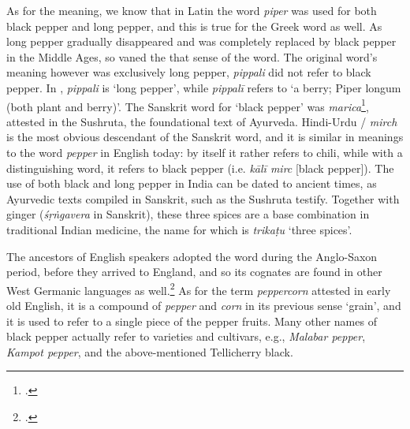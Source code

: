 As for the meaning, we know that in Latin the word \textit{piper} was used for both black pepper and long pepper, and this is true for the Greek word as well. As long pepper gradually disappeared and was completely replaced by black pepper in the Middle Ages, so vaned the that sense of the word. The original word's meaning however was exclusively long pepper, \textit{pippali} did not refer to black pepper. In \textcite{monier-williams_sanskrit-english_1899}, \textit{pippali} is `long pepper', while \textit{pippalī} refers to `a berry; Piper longum (both plant and berry)'. The Sanskrit word for `black pepper' was  \textit{marica}\footcite[790]{monier-williams_sanskrit-english_1899}, attested in the \gls{Sushruta}, the foundational text of \gls{Ayurveda}. Hindi-Urdu / \textit{mirch} is the most obvious descendant of the Sanskrit word, and it is similar in meanings to the word \textit{pepper} in English today: by itself it rather refers to chili, while with a distinguishing word, it refers to black pepper (i.e. \textit{kālī mirc} [black pepper]). The use of both black and long pepper in India can be dated to ancient times, as Ayurvedic texts compiled in Sanskrit, such as the \gls{Sushruta} testify. Together with ginger (\textit{śṛṅgavera} in Sanskrit), these three spices are a base combination in traditional Indian medicine, the name for which is  \textit{trikaṭu} `three spices'.

The ancestors of English speakers adopted the word during the Anglo-Saxon period, before they arrived to England, and so its cognates are found in other West Germanic languages as well.\footcite[pepper]{cresswell_oxford_2021} As for the term \textit{peppercorn} attested in early old English, it is a compound of \textit{pepper} and \textit{corn}  in its previous sense `grain', and it is used to refer to a single piece of the pepper fruits. Many other names of black pepper actually refer to varieties and cultivars, e.g., \textit{Malabar pepper}, \textit{Kampot pepper}, and the above-mentioned Tellicherry black.




